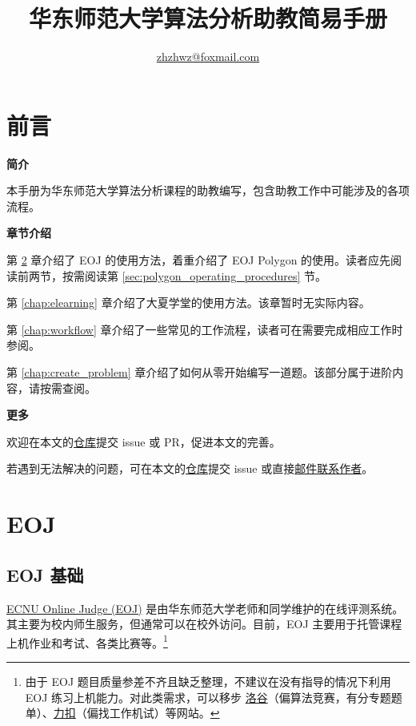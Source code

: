 \documentclass[oneside]{book}
\title{华东师范大学算法分析助教简易手册}
\author{\href{mailto:zhzhwz@foxmail.com}{zhzhwz@foxmail.com}}
\begin{document}
\frontmatter

\maketitle

\chapter{前言}

\noindent \textbf{简介}

本手册为华东师范大学算法分析课程的助教编写，包含助教工作中可能涉及的各项流程。

\bigbreak

\noindent \textbf{章节介绍}

第 \ref{chap:eoj} 章介绍了 EOJ 的使用方法，着重介绍了 EOJ Polygon 的使用。读者应先阅读前两节，按需阅读第 \ref{sec:polygon_operating_procedures} 节。

第 \ref{chap:elearning} 章介绍了大夏学堂的使用方法。该章暂时无实际内容。

第 \ref{chap:workflow} 章介绍了一些常见的工作流程，读者可在需要完成相应工作时参阅。

第 \ref{chap:create_problem} 章介绍了如何从零开始编写一道题。该部分属于进阶内容，请按需查阅。

\bigbreak

\noindent \textbf{更多}

欢迎在本文的\href{https://github.com/zhzhwz/AlgorithmTAManual}{仓库}提交 issue 或 PR，促进本文的完善。

若遇到无法解决的问题，可在本文的\href{https://github.com/zhzhwz/AlgorithmTAManual}{仓库}提交 issue 或直接\href{mailto:zhzhwz@foxmail.com}{邮件联系作者}。 

\tableofcontents

\mainmatter

\chapter{EOJ}

\label{chap:eoj}

\section{EOJ 基础}

\label{sec:eoj_basics}

\href{https://acm.ecnu.edu.cn/}{ECNU Online Judge (EOJ)} 是由华东师范大学老师和同学维护的在线评测系统。其主要为校内师生服务，但通常可以在校外访问。目前，EOJ 主要用于托管课程上机作业和考试、各类比赛等。\footnote{由于 EOJ 题目质量参差不齐且缺乏整理，不建议在没有指导的情况下利用 EOJ 练习上机能力。对此类需求，可以移步 \href{https://www.luogu.com.cn/}{洛谷}（偏算法竞赛，有分专题题单）、\href{https://leetcode.cn/}{力扣}（偏找工作机试）等网站。}
\end{document}
